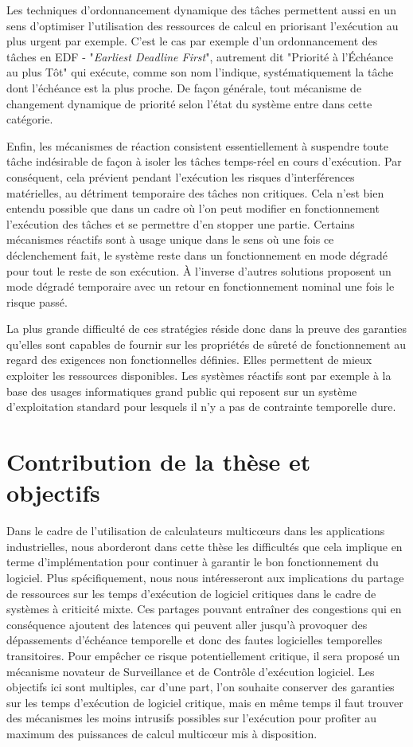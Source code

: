 \documentclass[french, a4paper, 11pt, twoside, pdftex]{StyleThese}
\begin{document}
		Les techniques d'ordonnancement dynamique des tâches permettent aussi en un sens d'optimiser l'utilisation des ressources de calcul en priorisant l'exécution au plus urgent par exemple. C'est le cas par exemple d'un ordonnancement des tâches en EDF - "\textit{Earliest Deadline First}", autrement dit "Priorité à l'Échéance au plus Tôt" qui exécute, comme son nom l'indique, systématiquement la tâche dont l'échéance est la plus proche. De façon générale, tout mécanisme de changement dynamique de priorité selon l'état du système entre dans cette catégorie.
		
		Enfin, les mécanismes de réaction consistent essentiellement à suspendre toute tâche indésirable de façon à isoler les tâches temps-réel en cours d'exécution. Par conséquent, cela prévient pendant l'exécution les risques d'interférences matérielles, au détriment temporaire des tâches non critiques. Cela n'est bien entendu possible que dans un cadre où l'on peut modifier en fonctionnement l'exécution des tâches et se permettre d'en stopper une partie. Certains mécanismes réactifs sont à usage unique dans le sens où une fois ce déclenchement fait, le système reste dans un fonctionnement en mode dégradé pour tout le reste de son exécution. À l'inverse d'autres solutions proposent un mode dégradé temporaire avec un retour en fonctionnement nominal une fois le risque passé. 
		
		La plus grande difficulté de ces stratégies réside donc dans la preuve des garanties qu'elles sont capables de fournir sur les propriétés de sûreté de fonctionnement au regard des exigences non fonctionnelles définies. Elles permettent de mieux exploiter les ressources disponibles. Les systèmes réactifs sont par exemple à la base des usages informatiques grand public qui reposent sur un système d'exploitation standard pour lesquels il n'y a pas de contrainte temporelle dure.


\section{Contribution de la thèse et objectifs}

	Dans le cadre de l'utilisation de calculateurs multicœurs dans les applications industrielles, nous aborderont dans cette thèse les difficultés que cela implique en terme d'implémentation pour continuer à garantir le bon fonctionnement du logiciel. Plus spécifiquement, nous nous intéresseront aux implications du partage de ressources sur les temps d'exécution de logiciel critiques dans le cadre de systèmes à criticité mixte. Ces partages pouvant entraîner des congestions qui en conséquence ajoutent des latences qui peuvent aller jusqu'à provoquer des dépassements d'échéance temporelle et donc des fautes logicielles temporelles transitoires. Pour empêcher ce risque potentiellement critique, il sera proposé un mécanisme novateur de Surveillance et de Contrôle d'exécution logiciel. Les objectifs ici sont multiples, car d'une part, l'on souhaite conserver des garanties sur les temps d'exécution de logiciel critique, mais en même temps il faut trouver des mécanismes les moins intrusifs possibles sur l'exécution pour profiter au maximum des puissances de calcul multicœur mis à disposition. 
	
\end{document}

